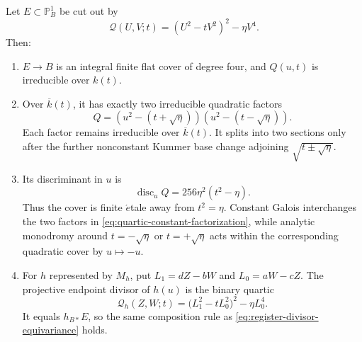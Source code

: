 \begin{theorem}
\label{thm:forced-register-quartic}
Let \(E\subset\mathbb P^1_B\) be cut out by
\begin{equation}
 \mathcal Q(U,V;t)=(U^2-tV^2)^2-\eta V^4.
 \label{eq:forced-binary-quartic}
\end{equation}
Then:
\begin{enumerate}
\item \(E\to B\) is an integral finite flat cover of degree four, and
\(Q(u,t)\) is irreducible over \(k(t)\).
\item Over \(\overline k(t)\), it has exactly two irreducible quadratic factors
\begin{equation}
 Q=(u^2-(t+\sqrt\eta))(u^2-(t-\sqrt\eta)).
 \label{eq:quartic-constant-factorization}
\end{equation}
Each factor remains irreducible over \(\overline k(t)\).  It splits into two
sections only after the further nonconstant Kummer base change adjoining
\(\sqrt{t\pm\sqrt\eta}\).
\item Its discriminant in \(u\) is
\begin{equation}
 \operatorname{disc}_u Q
 =256\eta^2(t^2-\eta).
 \label{eq:quartic-register-discriminant}
\end{equation}
Thus the cover is finite \(\acute{e}\)tale away from \(t^2=\eta\).  Constant
Galois interchanges the two factors in
\eqref{eq:quartic-constant-factorization}, while analytic monodromy around
\(t=-\sqrt\eta\) or \(t=+\sqrt\eta\) acts within the corresponding quadratic
cover by \(u\mapsto-u\).
\item For \(h\) represented by \(M_h\), put
\(L_1=dZ-bW\) and \(L_0=aW-cZ\).  The projective endpoint divisor of
\(h(u)\) is the binary quartic
\begin{equation}
 \mathcal Q_h(Z,W;t)
 =\bigl(L_1^2-tL_0^2\bigr)^2-\eta L_0^4.
 \label{eq:quartic-projective-pushforward}
\end{equation}
It equals \(h_{B*}E\), so the same composition rule as
\eqref{eq:register-divisor-equivariance} holds.
\end{enumerate}
\end{theorem}

